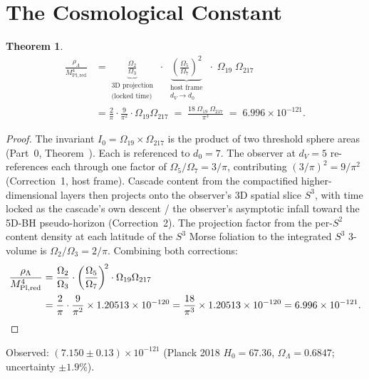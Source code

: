 \documentclass[11pt,a4paper]{article}
\newtheorem{theorem}{Theorem}[section]
\begin{document}
\section{The Cosmological Constant}

\begin{theorem}\label{thm:cc}
\[
\begin{aligned}
\frac{\rho_\Lambda}{M^4_{\mathrm{Pl,red}}}
&= \underbrace{\frac{\Omega_2}{\Omega_3}}_{\substack{\text{3D projection}\\ \text{(locked time)}}}
\;\cdot\;\underbrace{\left(\frac{\Omega_5}{\Omega_7}\right)^{\!2}}_{\substack{\text{host frame}\\ d_V\to d_0}}
\;\cdot\;\Omega_{19}\;\Omega_{217} \\
&= \frac{2}{\pi}\cdot\frac{9}{\pi^2}\cdot\Omega_{19}\Omega_{217}
\;=\; \frac{18\;\Omega_{19}\;\Omega_{217}}{\pi^3}
\;=\; 6.996\times 10^{-121}.
\end{aligned}
\]
\end{theorem}

\begin{proof}
The invariant $I_0 = \Omega_{19}\times\Omega_{217}$ is the product of
two threshold sphere areas (Part~0, Theorem~). Each is referenced
to $d_0 = 7$. The observer at $d_V = 5$ re-references each through one
factor of $\Omega_5/\Omega_7 = 3/\pi$, contributing
$(3/\pi)^2 = 9/\pi^2$ (Correction~1, host frame). Cascade content from
the compactified higher-dimensional layers then projects onto the
observer's 3D spatial slice $S^3$, with time locked as the cascade's
own descent / the observer's asymptotic infall toward the 5D-BH
pseudo-horizon (Correction~2). The projection factor from the
per-$S^2$ content density at each latitude of the $S^3$ Morse
foliation to the integrated $S^3$ 3-volume is
$\Omega_2/\Omega_3 = 2/\pi$. Combining both corrections:
\[
\begin{aligned}
\frac{\rho_\Lambda}{M^4_{\mathrm{Pl,red}}}
&= \frac{\Omega_2}{\Omega_3}\cdot\left(\frac{\Omega_5}{\Omega_7}\right)^{\!2}\cdot\Omega_{19}\Omega_{217} \\
&= \frac{2}{\pi}\cdot\frac{9}{\pi^2}\times 1.20513\times 10^{-120}
= \frac{18}{\pi^3}\times 1.20513\times 10^{-120}
= 6.996\times 10^{-121}.\qedhere
\end{aligned}
\]
\end{proof}

Observed: $(7.150\pm 0.13)\times 10^{-121}$ (Planck 2018 $H_0=67.36$,
$\Omega_\Lambda=0.6847$; uncertainty $\pm 1.9\%$).
\end{document}
